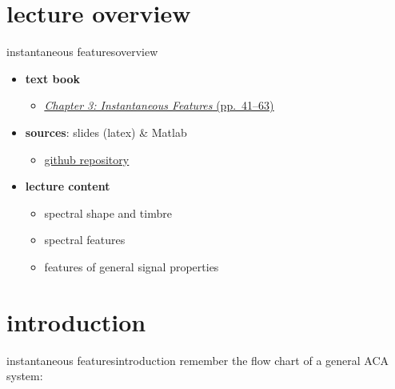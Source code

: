     \section[overview]{lecture overview}
        \begin{frame}{instantaneous features}{overview}
            \begin{itemize}
                \item   \textbf{text book}  
                    \begin{itemize}
                        \item   \href{http://ieeexplore.ieee.org/xpl/articleDetails.jsp?tp=&arnumber=6331120&}{\underline{\textit{Chapter 3: Instantaneous Features} (pp.~41--63)}}
                    \end{itemize}
                \item   \textbf{sources}: slides (latex) \& Matlab  
                    \begin{itemize}
                        \item   \href{https://github.com/alexanderlerch/ACA-Slides}{\underline{github repository}}
                    \end{itemize}
                \bigskip
                \item<2->   \textbf{lecture content}
                    \begin{itemize}
                        \item<2->   spectral shape and timbre
                        \item<3->   spectral features
                        \item<4->   features of general signal properties
                    \end{itemize}
            \end{itemize}
        \end{frame}

    \section[intro]{introduction}
        \begin{frame}{instantaneous features}{introduction}
            remember the flow chart of a general ACA system:
            \vspace{-2mm}
            \begin{figure}
                
            \end{figure}
        \end{frame}
        
